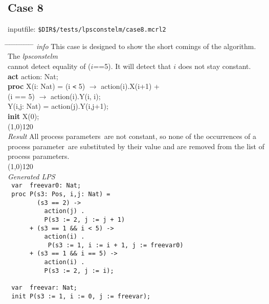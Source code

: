\index{}\documentclass[a4paper,10pt]{article}
\theoremstyle{plain}
\theoremstyle{definition}
\newcommand{\tool}{\textit{lpsconstelm}}
\newcommand{\pp}{process parameter}
\newcommand{\pps}{process parameters}
\newcommand{\ti}{\textit}
\newcommand{\tb}{\textbf}
\newcommand{\tabw}{\hspace*{15.mm} \= \hspace*{20.mm} \= \hspace*{5.mm} \= \hspace*{5.mm} \= \hspace*{5.mm} \= \hspace*{5.mm}  \= \hspace*{5.mm}  \= \hspace*{5.mm}  \= \hspace*{5.mm} \= \hspace*{5.mm} \= \hspace*{5.mm}  \= \hspace*{5.mm}  \= \hspace*{5.mm}\kill}
\begin{document}
\subsection*{Case 8}
inputfile: \verb"$DIR$/tests/lpsconstelm/case8.mcrl2"
\begin{tabbing}
\tabw
\ti{info} \> This case is designed to show the short comings of the algorithm. The \tool \ \\
	\> cannot detect equality of ($i$==5). It will detect that $i$ does not stay constant. \\ 
\tb{act} \> action: Nat;\\
\tb{proc} \> X(i: Nat)   = \>  (i \verb"<"  5) $\rightarrow$ action(i).X(i+1) +\\
           \>        \> (i == 5) $\rightarrow$ action(i).Y(i, i);\\
    \>  Y(i,j: Nat) = \>  action(j).Y(i,j+1);               \\
\tb{init} X(0);\\
\line(1,0){120}\\
\ti{Result} \> All \pps\ are not constant, so none of the occurrences of a \\
\> \pp\ are substituted by their value and are removed from the list of \\
\> \pps.\\
\line(1,0){120}\\
\ti{Generated LPS} \\
\>  \verb" var  freevar0: Nat;"                              \\      %
\>  \verb" proc P(s3: Pos, i,j: Nat) = "                       \\    %
\>  \verb"        (s3 == 2) ->        "                        \\    %
\>  \verb"          action(j) .     "                          \\    %
\>  \verb"          P(s3 := 2, j := j + 1)"                    \\    %
\>  \verb"      + (s3 == 1 && i < 5) ->"                       \\    %
\>  \verb"          action(i) . "                              \\    %
\>  \verb"           P(s3 := 1, i := i + 1, j := freevar0) "   \\    %
\>  \verb"      + (s3 == 1 && i == 5) -> "                     \\    %
\>  \verb"          action(i) .       "                        \\    %
\>  \verb"          P(s3 := 2, j := i);"                       \\    %
\>  \verb"                            "                        \\    %
\>  \verb" var  freevar: Nat;      "                           \\    %
\>  \verb" init P(s3 := 1, i := 0, j := freevar);"             \\    %
\end{tabbing}
\end{document}
